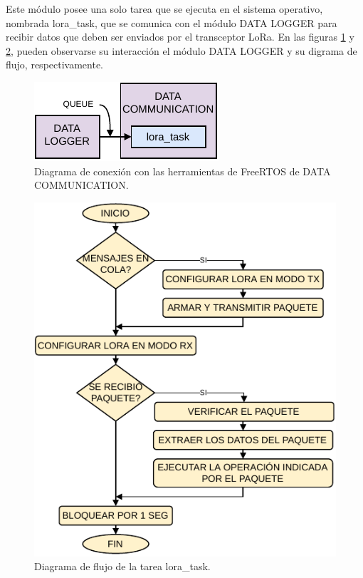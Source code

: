 Este módulo posee una solo tarea que se ejecuta en el sistema operativo, nombrada lora\_task, que se comunica con el módulo DATA LOGGER para recibir datos que deben ser enviados por el transceptor LoRa. En las figuras \ref{fig:dataCom} y \ref{fig:loraTask}, pueden observarse su interacción el módulo DATA LOGGER y su digrama de flujo, respectivamente.

\begin{figure}[h]
	\centering
	\includegraphics[scale=1.1]{./Figures/lora_communication_com.pdf}
	\caption{Diagrama de conexión con las herramientas de FreeRTOS de DATA COMMUNICATION.}
		\label{fig:dataCom}
\end{figure}

\begin{figure}[h]
	\centering
	\includegraphics[scale=1.1]{./Figures/lora_communication_task.pdf}
	\caption{Diagrama de flujo de la tarea lora\_task.}
		\label{fig:loraTask}
\end{figure}

